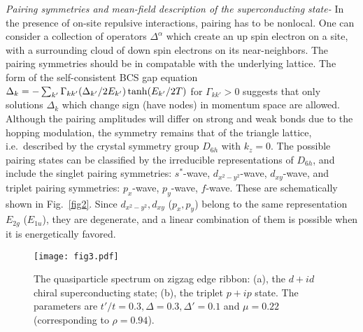 \documentclass[%
 reprint,
 amsmath,amssymb,
 aps,
]{revtex4-1}
\begin{document}
\textit{Pairing symmetries and mean-field description of the
superconducting state-}
In the presence of on-site repulsive interactions,
pairing has to be nonlocal.   One can consider a collection of
operators $\Delta^\alpha$ which create an up spin electron
on a site, with a surrounding cloud of down spin electrons on
its near-neighbors.
The pairing symmetries should
be in compatable with the underlying lattice.
The form of the self-consistent BCS gap equation
$\Delta_k = -\sum_{k'} \Gamma_{kk'} (\Delta_{k'}/2E_{k'})
\, {\rm tanh}(E_{k'}/2T)$
for $\Gamma_{kk'}>0$ suggests that only solutions $\Delta_k$ which
change sign (have nodes) in momentum space are allowed\cite{sc2}.
Although the pairing
amplitudes will differ on strong and weak bonds due to the hopping
modulation, the symmetry remains that of the triangle lattice,
i.e.~described by the crystal symmetry group $D_{6h}$ with $k_z=0$. The
possible pairing states can be classified by the irreducible
representations of $D_{6h}$, and include the singlet pairing
symmetries: $s^*$-wave, $d_{x^2-y^2}$-wave, $d_{xy}$-wave, and triplet
pairing symmetries: $p_x$-wave, $p_y$-wave, $f$-wave.  These are
schematically shown in Fig.~\ref{fig2}. Since $d_{x^2-y^2}, d_{xy}$
($p_x, p_y$) belong to the same representation $E_{2g}$ ($E_{1u}$), they
are degenerate, and a linear combination of them is possible when it is
energetically favored.

\begin{figure}[htbp]
\centering \texttt{[image: fig3.pdf]} \caption{The
quasiparticle spectrum on zigzag edge ribbon: (a), the $d+id$ chiral
superconducting state; (b), the triplet $p+ip$ state. The parameters are
$t'/t=0.3, \Delta=0.3, \Delta'=0.1$ and $\mu=0.22$ (corresponding to
$\rho=0.94$).}
\label{fig3}
\end{figure}
\end{document}
